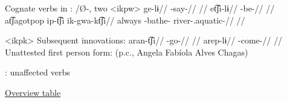 \documentclass[9pt]{beamer}
\begin{document}
\begin{frame}[allowframebreaks]{Cognate verbs in \ikpeng: /Ø-, two }
\small
\pex<ikpw>
\begingl
\gla {}ge-lɨ//
\glb {}-say-//
\glft {} \parencite[][209]{ikpengpacheco2001}//
\endgl
{}
\begingl
\gla {}et͡ʃi-lɨ//
\glb {}-be-//
\glft {} \parencite[][139]{ikpengpacheco2001}//
\endgl
{}
\begingl
\gla at͡ʃagotpop ip-t͡ʃi ik-gwa-kt͡ʃi//
\glb always -bathe- river-.aquatic-//
\glft {} \parencite[][68]{ikpengpacheco1997}//
\endgl
\xe

\pex<ikpk> Subsequent innovations:
\begingl
\gla {}aran-t͡ʃi//
\glb {}-go-//
\glft {} \parencite[][80]{ikpengpacheco2001}//
\endgl
{}
\begingl
\gla {}arep-lɨ//
\glb {}-come-//
\glft {} \parencite[][80]{ikpengpacheco2001}//
\endgl
\xe
Unattested first person form:   (p.c., Angela Fabíola Alves Chagas)
\end{frame}

\begin{frame}{\PPek {}: unaffected verbs}
\begin{center}
\hyperlink{ppek}{Overview table}	
\end{center}
\end{frame}
\end{document}
